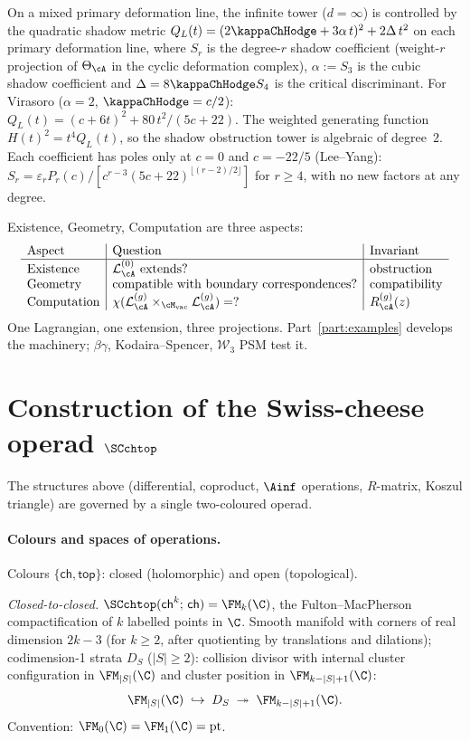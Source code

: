 On a mixed primary deformation line, the infinite tower
($d = \infty$) is controlled by the quadratic shadow metric
$Q_L(t) = (2\kappaChHodge + 3\alpha\,t)^2 + 2\Delta\,t^2$
on each primary deformation line, where $S_r$ is the degree-$r$
shadow coefficient (weight-$r$ projection of $\Theta_\cA$ in the
cyclic deformation complex), $\alpha := S_3$ is the cubic shadow
coefficient and $\Delta = 8\kappaChHodge S_4$ is the
critical discriminant. For Virasoro ($\alpha = 2$,
$\kappaChHodge = c/2$):
$Q_L(t) = (c + 6t)^2 + 80\,t^2/(5c{+}22)$. The weighted
generating function $H(t)^2 = t^4 Q_L(t)$, so the shadow
obstruction tower is algebraic of degree~$2$. Each coefficient
has poles only at $c = 0$ and $c = -22/5$ (Lee--Yang):
$S_r = \varepsilon_r P_r(c)/[c^{r-3}(5c{+}22)^{\lfloor(r-2)/2\rfloor}]$
for $r \ge 4$, with no new factors at any degree.

Existence, Geometry, Computation are three aspects:
\[
\begin{array}{l|l|l}
\text{Aspect} & \text{Question} & \text{Invariant} \\
\hline
\text{Existence} & \cL_\cA^{(0)}\ \text{extends?} &
 \text{obstruction} \\
\text{Geometry} & \text{compatible with boundary correspondences?} &
 \text{compatibility} \\
\text{Computation} & \chi(\cL_\cA^{(g)} \times_{\Mvac} \cL_\cA^{(g)}) = ? &
 R^{(g)}_\cA(z)
\end{array}
\]
One Lagrangian, one extension, three projections.
Part~\ref{part:examples} develops the machinery; $\beta\gamma$,
Kodaira--Spencer, $\mathcal{W}_3$ PSM test it.

\section*{Construction of the Swiss-cheese operad $\SCchtop$}

The structures above (differential, coproduct, $\Ainf$
operations, $R$-matrix, Koszul triangle) are governed by a
single two-coloured operad.

\paragraph{Colours and spaces of operations.}
Colours $\{\mathsf{ch}, \mathsf{top}\}$: closed (holomorphic)
and open (topological).

\emph{Closed-to-closed.}
$\SCchtop(\mathsf{ch}^k;\,\mathsf{ch}) = \FM_k(\C)$, the
Fulton--MacPherson compactification of $k$ labelled points in
$\C$. Smooth manifold with corners of real dimension
$2k - 3$ (for $k \ge 2$, after quotienting by translations and
dilations); codimension-1 strata $D_S$ ($|S| \ge 2$): collision
divisor with internal cluster configuration in $\FM_{|S|}(\C)$
and cluster position in $\FM_{k - |S| + 1}(\C)$:
\begin{equation}
\label{eq:intro-FM-fibration}
\FM_{|S|}(\C) \;\hookrightarrow\; D_S \;\twoheadrightarrow\;
\FM_{k - |S| + 1}(\C).
\end{equation}
Convention: $\FM_0(\C) = \FM_1(\C) = \mathrm{pt}$.


